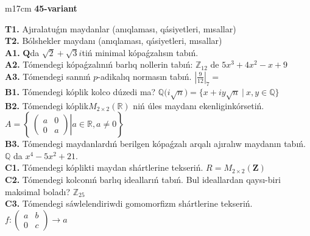 \documentclass{article}
\begin{document}
\begin{tabular}{m{17cm}}
\textbf{45-variant}
\newline

\textbf{T1.} Ajıralatuǵın maydanlar (anıqlaması, qásiyetleri, mısallar) \\
\textbf{T2.} Bólshekler maydanı (anıqlaması, qásiyetleri, mısallar) \\
\textbf{A1.} \(\mathbf{Q}\)da \(\sqrt{2} + \sqrt{3}i\)tiń minimal kópaǵzalısın tabıń. \\
\textbf{A2.} Tómendegi kópaǵzalınıń barlıq nollerin tabıń: \(\mathbb{Z}_{12}\) de \(5x^{3} + 4x^{2} - x + 9\) \\
\textbf{A3.} Tómendegi sannıń \(p\)-adikalıq normasın tabıń. \(|\frac{9}{12}|_{7} =\) \\
\textbf{B1.} Tómendegi kóplik kolco dúzedi ma? \(\mathbb{Q(}i\sqrt{n}) = \{ x + iy\sqrt{n}\ |\ x,y \in \mathbb{Q}\}\) \\
\textbf{B2.} Tómendegi kóplik\(M_{2 \times 2}\left( \mathbb{R} \right)\) niń úles maydanı ekenliginkórsetiń. \(A = \left\{ \left. \ \begin{pmatrix}
a & 0 \\
0 & a
\end{pmatrix} \right|a\mathbb{\in R},a \neq 0 \right\}\) \\
\textbf{B3.} Tómendegi maydanlardıń berilgen kópaǵzalı arqalı ajıralıw maydanın tabıń.
\(\mathbb{Q}\) da \(x^{4} - 5x^{2} + 21\). \\
\textbf{C1.} Tómendegi kóplikti maydan shártlerine tekseriń. \(R = M_{2 \times 2}\left( \mathbf{Z} \right)\) \\
\textbf{C2.} Tómendegi kolconıń barlıq ideallarıń tabıń. Bul ideallardan qaysı-biri maksimal boladı? \(\mathbb{Z}_{25}\) \\
\textbf{C3.} Tómendegi sáwlelendiriwdi gomomorfizm shártlerine tekseriń. \(f:\begin{pmatrix}
a & b \\
0 & c
\end{pmatrix} \rightarrow a\) \\

\end{tabular}
\vspace{1cm}
\end{document}

